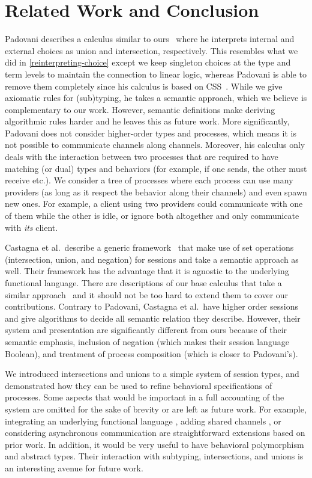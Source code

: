 \documentclass[submission,copyright,creativecommons]{eptcs}
\begin{document}
\section{Related Work and Conclusion}
\label{conclusion}

Padovani describes a calculus similar to ours~\cite{Padovani10} where he interprets internal and external choices as union and intersection, respectively. This resembles what we did in \cref{reinterpreting-choice} except we keep singleton choices at the type and term levels to maintain the connection to linear logic, whereas Padovani is able to remove them completely since his calculus is based on \textsc{CSS}~\cite{NicolaH87}. While we give axiomatic rules for (sub)typing, he takes a semantic approach, which we believe is complementary to our work. However, semantic definitions make deriving algorithmic rules harder and he leaves this as future work. More significantly, Padovani does not consider higher-order types and processes, which means it is not possible to communicate channels along channels. Moreover, his calculus only deals with the interaction between two processes that are required to have matching (or dual) types and behaviors (for example, if one sends, the other must receive etc.). We consider a tree of processes where each process can use many providers (as long as it respect the behavior along their channels) and even spawn new ones. For example, a client using two providers could communicate with one of them while the other is idle, or ignore both altogether and only communicate with \emph{its} client.

Castagna et al.\ describe a generic framework~\cite{CastagnaDGP09} that make use of set operations (intersection, union, and negation) for sessions and take a semantic approach as well. Their framework has the advantage that it is agnostic to the underlying functional language. There are descriptions of our base calculus that take a similar approach~\cite{ToninhoCP13} and it should not be too hard to extend them to cover our contributions. Contrary to Padovani, Castagna et al.\ have higher order sessions and give algorithms to decide all semantic relation they describe. However, their system and presentation are significantly different from ours because of their semantic emphasis, inclusion of negation (which makes their session language Boolean), and treatment of process composition (which is closer to Padovani's).

We introduced intersections and unions to a simple system of session types, and demonstrated how they can be used to refine behavioral specifications of processes. Some aspects that would be important in a full accounting of the system are omitted for the sake of brevity or are left as future work. For example, integrating an underlying functional language \cite{ToninhoCP13}, adding shared channels \cite{CairesP10,PfenningG15}, or considering asynchronous communication \cite{DeYoungCPT12,PfenningG15,Griffith16phd} are straightforward extensions based on prior work. In addition, it would be very useful to have behavioral polymorphism \cite{CairesPPT13} and abstract types. Their interaction with subtyping, intersections, and unions is an interesting avenue for future work.








\end{document}
